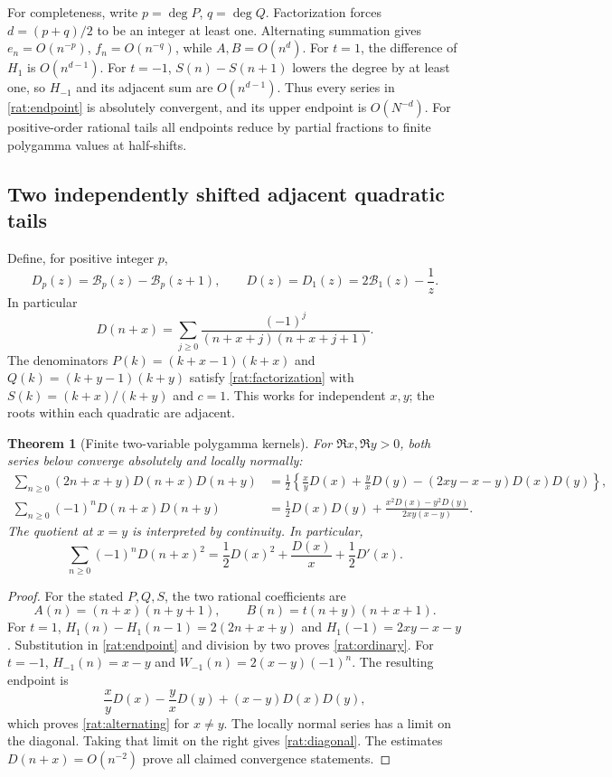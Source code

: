 \documentclass[11pt]{article}
\newtheorem{theorem}{Theorem}[section]
\theoremstyle{definition}
\theoremstyle{remark}
\numberwithin{equation}{section}
\begin{document}
For completeness, write $p=\deg P$, $q=\deg Q$. Factorization forces
$d=(p+q)/2$ to be an integer at least one. Alternating summation
gives $e_n=O(n^{-p})$, $f_n=O(n^{-q})$, while $A,B=O(n^d)$.
For $t=1$, the difference of $H_1$ is $O(n^{d-1})$. For $t=-1$,
$S(n)-S(n+1)$ lowers the degree by at least one, so $H_{-1}$ and
its adjacent sum are $O(n^{d-1})$. Thus every series in
\eqref{rat:endpoint} is absolutely convergent, and its upper endpoint
is $O(N^{-d})$. For positive-order rational tails all endpoints
reduce by partial fractions to finite polygamma values at half-shifts.

\subsection{Two independently shifted adjacent quadratic tails}

Define, for positive integer $p$,
\begin{equation}\label{rat:D-definition}
 D_p(z)=\mathcal B_p(z)-\mathcal B_p(z+1),\qquad
 D(z)=D_1(z)=2\mathcal B_1(z)-\frac1z.
\end{equation}
In particular
\[
 D(n+x)=\sum_{j\ge0}\frac{(-1)^j}
                          {(n+x+j)(n+x+j+1)}.
\]
The denominators $P(k)=(k+x-1)(k+x)$ and
$Q(k)=(k+y-1)(k+y)$ satisfy \eqref{rat:factorization} with
$S(k)=(k+x)/(k+y)$ and $c=1$. This works for independent $x,y$;
the roots within each quadratic are adjacent.

\begin{theorem}[Finite two-variable polygamma kernels]\label{rat:kernels}
For $\Re x,\Re y>0$, both series below converge absolutely and
locally normally:
\begin{align}
 \sum_{n\ge0}(2n+x+y)D(n+x)D(n+y)
 &=\frac12\left\{\frac{x}{y}D(x)+\frac{y}{x}D(y)
                -(2xy-x-y)D(x)D(y)\right\},\label{rat:ordinary}\\
 \sum_{n\ge0}(-1)^nD(n+x)D(n+y)
 &=\frac12D(x)D(y)
    +\frac{x^2D(x)-y^2D(y)}{2xy(x-y)}.\label{rat:alternating}
\end{align}
The quotient at $x=y$ is interpreted by continuity. In particular,
\begin{equation}\label{rat:diagonal}
 \sum_{n\ge0}(-1)^nD(n+x)^2
     =\frac12D(x)^2+\frac{D(x)}x+\frac12D'(x).
\end{equation}
\end{theorem}

\begin{proof}
For the stated $P,Q,S$, the two rational coefficients are
\[
 A(n)=(n+x)(n+y+1),\qquad
 B(n)=t(n+y)(n+x+1).
\]
For $t=1$, $H_1(n)-H_1(n-1)=2(2n+x+y)$ and
$H_1(-1)=2xy-x-y$. Substitution in \eqref{rat:endpoint} and
division by two proves \eqref{rat:ordinary}. For $t=-1$,
$H_{-1}(n)=x-y$ and $W_{-1}(n)=2(x-y)(-1)^n$.
The resulting endpoint is
\[
 \frac{x}{y}D(x)-\frac{y}{x}D(y)+(x-y)D(x)D(y),
\]
which proves \eqref{rat:alternating} for $x\ne y$.
The locally normal series has a limit on the diagonal. Taking that
limit on the right gives \eqref{rat:diagonal}. The estimates
$D(n+x)=O(n^{-2})$ prove all claimed convergence statements.
\end{proof}
\end{document}
